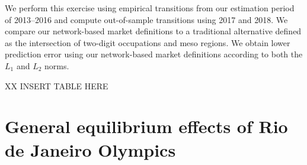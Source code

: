 \documentclass[12pt]{article}
\def\g{\gamma}
\def\i{\iota}
\theoremstyle{definition}
\theoremstyle{plain}
\begin{document}
We perform this exercise using empirical transitions from our estimation period of 2013--2016 and compute out-of-sample transitions using 2017 and 2018. We compare our network-based market definitions to a traditional alternative defined as the intersection of two-digit occupations and meso regions. We obtain lower prediction error using our network-based market definitions according to both the $L_1$ and $L_2$ norms. 

XX INSERT TABLE HERE




\section{General equilibrium effects of Rio de Janeiro Olympics}

\label{sec:model_fit}

%
\end{document}
